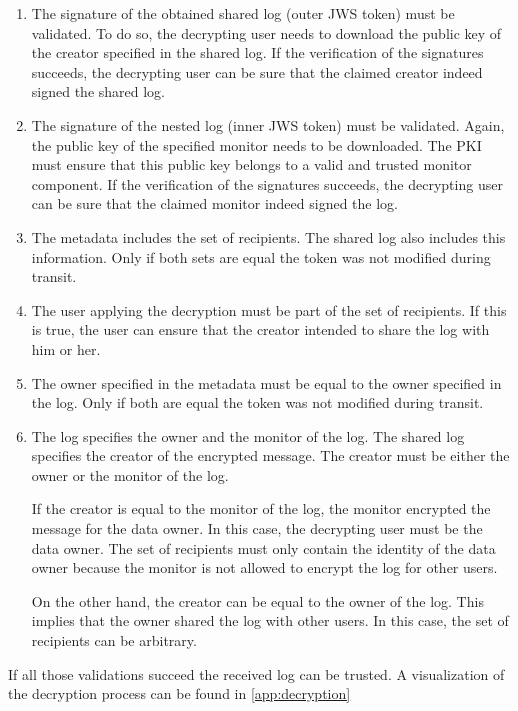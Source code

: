 \documentclass[../main.tex]{subfiles}
\begin{document}
\begin{enumerate}
    \item 
    The signature of the obtained shared log (outer JWS token) must be validated.
    To do so, the decrypting user needs to download the public key of the creator specified in the shared log.
    If the verification of the signatures succeeds, the decrypting user can be sure that the claimed creator indeed signed the shared log.
    \item
    The signature of the nested log (inner JWS token) must be validated.
    Again, the public key of the specified monitor needs to be downloaded.
    The PKI must ensure that this public key belongs to a valid and trusted monitor component.
    If the verification of the signatures succeeds, the decrypting user can be sure that the claimed monitor indeed signed the log.
    \item
    The metadata includes the set of recipients.
    The shared log also includes this information.
    Only if both sets are equal the token was not modified during transit.
    \item
    The user applying the decryption must be part of the set of recipients.
    If this is true, the user can ensure that the creator intended to share the log with him or her.
    \item
    The owner specified in the metadata must be equal to the owner specified in the log.
    Only if both are equal the token was not modified during transit.
    \item
    The log specifies the owner and the monitor of the log.
    The shared log specifies the creator of the encrypted message.
    The creator must be either the owner or the monitor of the log.
    
    If the creator is equal to the monitor of the log, the monitor encrypted the message for the data owner.
    In this case, the decrypting user must be the data owner.
    The set of recipients must only contain the identity of the data owner because the monitor is not allowed to encrypt the log for other users.

    On the other hand, the creator can be equal to the owner of the log.
    This implies that the owner shared the log with other users.
    In this case, the set of recipients can be arbitrary.
\end{enumerate}
If all those validations succeed the received log can be trusted.
A visualization of the decryption process can be found in \cref{app:decryption}
\end{document}
